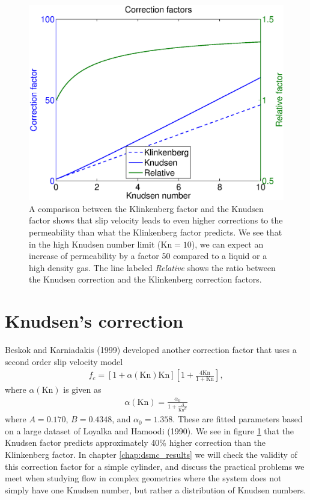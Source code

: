 \begin{figure}[h]
\begin{center}
\includegraphics[width=\textwidth, trim=0cm 0cm 0cm 0cm, clip]{figures/klinkenberg.eps}
\end{center}
\caption{A comparison between the Klinkenberg factor and the Knudsen factor shows that slip velocity leads to even higher corrections to the permeability than what the Klinkenberg factor predicts. We see that in the high Knudsen number limit ($\text{Kn}=10$), we can expect an increase of permeability by a factor 50 compared to a liquid or a high density gas. The line labeled \textit{Relative} shows the ratio between the Knudsen correction and the Klinkenberg correction factors.}
\label{fig:klinkenberg_correction_factor}
\end{figure}

\section{Knudsen's correction}
\label{sec:knudsen_correction}
Beskok and Karniadakis (1999) developed another correction factor that uses a second order slip velocity model 
\begin{align}
	\label{eq:knudsen_correction}
	f_c = [1 + \alpha(\text{Kn})\text{Kn}]\left[1 + \frac{4\text{Kn}}{ 1 + \text{Kn}}\right],
\end{align}
where $\alpha(\text{Kn})$ is given as\cite{civan2010effective}
\begin{align}
	\alpha(\text{Kn}) = \frac{\alpha_0}{1 + \frac{A}{\text{Kn}^B}}
\end{align} 
where $A=0.170$, $B=0.4348$, and $\alpha_0=1.358$. These are fitted parameters based on a large dataset of Loyalka and Hamoodi (1990). We see in figure \ref{fig:klinkenberg_correction_factor} that the Knudsen factor predicts approximately 40\% higher correction than the Klinkenberg factor. In chapter \ref{chap:dsmc_results} we will check the validity of this correction factor for a simple cylinder, and discuss the practical problems we meet when studying flow in complex geometries where the system does not simply have one Knudsen number, but rather a distribution of Knudsen numbers.